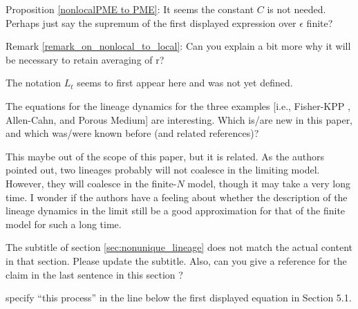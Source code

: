 \begin{point}{}
Proposition \ref{nonlocalPME to PME}:
    It seems the constant $C$ is not needed. Perhaps just say the supremum
of the first displayed expression over $\epsilon$ finite?
\end{point}

\reply{
}

\begin{point}{}
Remark \ref{remark_on_nonlocal_to_local}: Can you explain a bit more why it will be necessary to retain averaging of r?
\end{point}

\reply{
}

\begin{point}{\revref}
The notation $L_t$ seems to first appear here and was not yet defined.
\end{point}


\begin{point}{}
    The equations for the lineage dynamics for the three examples [i.e., Fisher-KPP \revref, Allen-Cahn, and Porous Medium] are interesting.
Which is/are new in this paper, and which was/were known before (and related references)?
\end{point}

\reply{
}

\begin{point}{}
This maybe out of the scope of this paper, but it is related. As the authors pointed out, two
lineages probably will not coalesce in the limiting model. However, they will coalesce in
the finite-$N$ model, though it may take a very long time. I wonder if the authors have a
feeling about whether the description of the lineage dynamics in the limit still be a good
approximation for that of the finite model for such a long time.
\end{point}

\reply{
}

\begin{point}{}
The subtitle of section \ref{sec:nonunique_lineage} does not match the actual content in that section. Please
update the subtitle. Also, can you give a reference for the claim in the last sentence in this
section \revref?
\end{point}

\reply{
}

\begin{point}{\revref}
specify ``this process'' in the line below the first displayed equation in
Section 5.1.
\end{point}

